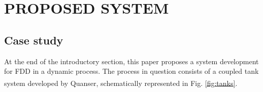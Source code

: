 \documentclass[10pt,fleqn,a4paper]{article}
\newcommand{\reg}{\textsuperscript{\textregistered}}
\begin{document}
\section{PROPOSED SYSTEM}\label{sec:proposed}

\subsection{Case study}
At the end of the introductory section, this paper proposes a system development
for FDD in a dynamic process. The process in question consists of a coupled tank
system developed by Quanser\reg, schematically represented in Fig.
\ref{fig:tanks}.
\end{document}

